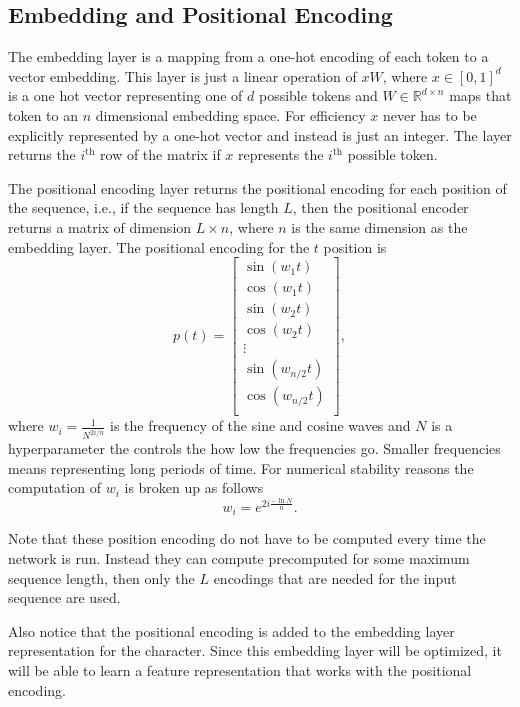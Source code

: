 \documentclass{article}
\begin{document}
\subsection{Embedding and Positional Encoding}
The embedding layer is a mapping from a one-hot encoding of each token to a vector embedding. This layer is just a linear operation of $xW$, where $x \in [0,1]^{d}$ is a one hot vector representing one of $d$ possible tokens and $W \in \mathbb{R}^{d \times n}$ maps that token to an $n$ dimensional embedding space. For efficiency $x$ never has to be explicitly represented by a one-hot vector and instead is just an integer. The layer returns the $i^\text{th}$ row of the matrix if $x$ represents the $i^\text{th}$ possible token. 

The positional encoding layer returns the positional encoding for each position of the sequence, i.e., if the sequence has length $L$, then the positional encoder returns a matrix of dimension $L \times n$, where $n$ is the same dimension as the embedding layer. The positional encoding for the $t$ position is 
\begin{equation}
    p(t) = \begin{bmatrix}
    \sin(w_1 t) \\
    \cos(w_1 t) \\
    \sin(w_2 t) \\
    \cos(w_2 t) \\
    \vdots \\
    \sin(w_{n/2} t) \\
    \cos(w_{n/2} t) \\
    \end{bmatrix},
\end{equation}
where $w_i = \frac{1}{N^{2i/n}}$ is the frequency of the sine and cosine waves and $N$ is a hyperparameter the controls the how low the frequencies go. Smaller frequencies means representing long periods of time. For numerical stability reasons the computation of $w_i$ is broken up as follows
\begin{equation}
    w_i = e^{2i \frac{-\ln N}{n}}.
\end{equation}

Note that these position encoding do not have to be computed every time the network is run. Instead they can compute precomputed for some maximum sequence length, then only the $L$ encodings that are needed for the input sequence are used. 

Also notice that the positional encoding is added to the embedding layer representation for the character. Since this embedding layer will be optimized, it will be able to learn a feature representation that works with the positional encoding. 
\end{document}
